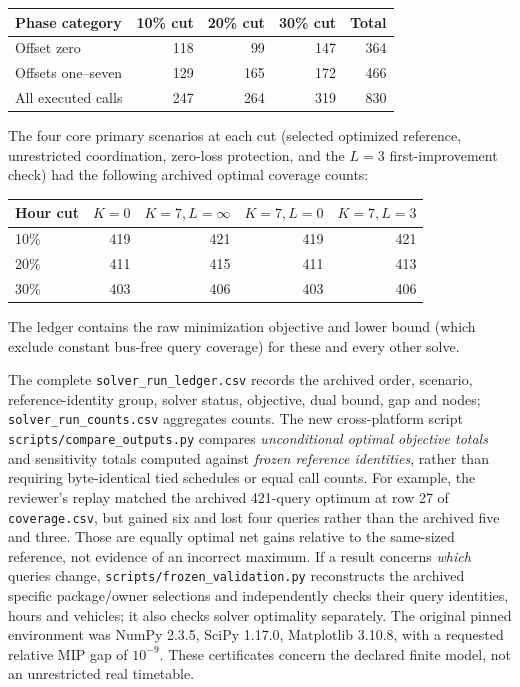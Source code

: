 \documentclass[10pt]{article}
\newcommand{\st}[1]{\texttt{\footnotesize #1}}
\begin{document}
\begin{center}\small
\begin{tabular}{@{}lrrrr@{}}\toprule
Phase category & 10\% cut & 20\% cut & 30\% cut & Total\\\midrule
Offset zero & 118 & 99 & 147 & 364\\
Offsets one--seven & 129 & 165 & 172 & 466\\
All executed calls & 247 & 264 & 319 & 830\\
\bottomrule\end{tabular}
\end{center}
The four core primary scenarios at each cut (selected optimized reference, unrestricted coordination, zero-loss protection, and the $L=3$ first-improvement check) had the following archived optimal coverage counts:
\begin{center}\small
\begin{tabular}{@{}lrrrr@{}}\toprule
Hour cut & $K=0$ & $K=7,L=\infty$ & $K=7,L=0$ & $K=7,L=3$ \\\midrule
10\% & 419 & 421 & 419 & 421 \\
20\% & 411 & 415 & 411 & 413 \\
30\% & 403 & 406 & 403 & 406 \\\bottomrule
\end{tabular}
\end{center}
The ledger contains the raw minimization objective and lower bound (which exclude constant bus-free query coverage) for these and every other solve. 

The complete \st{solver\_run\_ledger.csv} records the archived order, scenario, reference-identity group, solver status, objective, dual bound, gap and nodes; \st{solver\_run\_counts.csv} aggregates counts. The new cross-platform script \st{scripts/compare\_outputs.py} compares \emph{unconditional optimal objective totals} and sensitivity totals computed against \emph{frozen reference identities}, rather than requiring byte-identical tied schedules or equal call counts. For example, the reviewer's replay matched the archived 421-query optimum at row 27 of \st{coverage.csv}, but gained six and lost four queries rather than the archived five and three. Those are equally optimal net gains relative to the same-sized reference, not evidence of an incorrect maximum. If a result concerns \emph{which} queries change, \st{scripts/frozen\_validation.py} reconstructs the archived specific package/owner selections and independently checks their query identities, hours and vehicles; it also checks solver optimality separately. The original pinned environment was NumPy 2.3.5, SciPy 1.17.0, Matplotlib 3.10.8, with a requested relative MIP gap of $10^{-9}$. These certificates concern the declared finite model, not an unrestricted real timetable.
\end{document}
